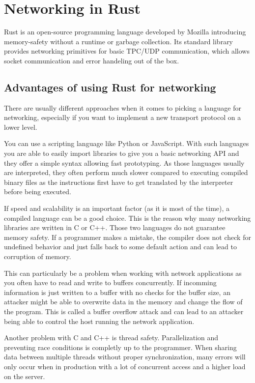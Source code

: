 
\section{Networking in Rust}
Rust is an open-source programming language developed by Mozilla introducing memory-safety without a runtime or garbage
collection. Its standard library provides networking primitives for basic TPC/UDP communication, which allows socket
communication and error handeling out of the box. \cite{rust-language}

\subsection{Advantages of using Rust for networking}
There are usually different approaches when it comes to picking a language for networking, especially if you want to
implement a new transport protocol on a lower level.

You can use a scripting language like Python or JavaScript. With such languages you are able to easily import libraries
to give you a basic networking API and they offer a simple syntax allowing fast prototyping. As those languages usually
are interpreted, they often perform much slower compared to executing compiled binary files as the instructions first
have to get translated by the interpreter before being executed.

If speed and scalability is an important factor (as it is most of the time), a compiled language can be a good choice.
This is the reason why many networking libraries are written in C or C++. Those two languages do not guarantee memory
safety. If a programmer makes a mistake, the compiler does not check for undefined behavior and just falls back to some
default action and can lead to corruption of memory.

This can particularly be a problem when working with network applications as you often have to read and write to
buffers concurrently. If incomming information is just written to a buffer with no checks for the buffer size, an
attacker might be able to overwrite data in the memory and change the flow of the program. This is called a buffer
overflow attack and can lead to an attacker being able to control the host running the network application.
\cite{821514}

Another problem with C and C++ is thread safety. Parallelization and preventing race conditions is completly up to the
programmer. When sharing data between multiple threads without proper synchronization, many errors will only occur when
in production with a lot of concurrent access and a higher load on the server.

